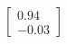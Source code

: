\documentclass[preview]{standalone}
\begin{document}
\begin{align*}
\begin{bmatrix} 0.94 \\ -0.03 \end{bmatrix}
\end{align*}
\end{document}
